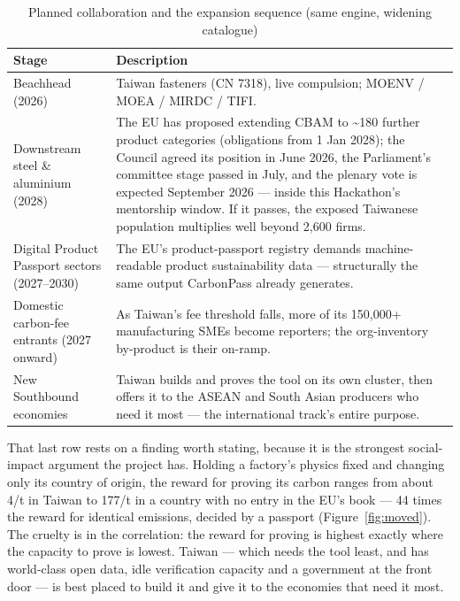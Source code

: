 \documentclass[11pt]{article}
\newcommand{\euro}{\texteuro}
\begin{document}
\begin{table}[h]
\caption{Planned collaboration and the expansion sequence (same engine, widening catalogue)}
\label{tab:expand}
\small
\begin{tabularx}{\textwidth}{l Y}
\toprule
\textbf{Stage} & \textbf{Description} \\
\midrule
Beachhead (2026) & Taiwan fasteners (CN 7318), live compulsion; MOENV / MOEA / MIRDC / TIFI. \\
Downstream steel \& aluminium (2028) & The EU has proposed extending CBAM to \textasciitilde180 further product categories (obligations from 1 Jan 2028); the Council agreed its position in June 2026, the Parliament's committee stage passed in July, and the plenary vote is expected September 2026 --- inside this Hackathon's mentorship window. If it passes, the exposed Taiwanese population multiplies well beyond 2{,}600 firms. \\
Digital Product Passport sectors (2027--2030) & The EU's product-passport registry demands machine-readable product sustainability data --- structurally the same output CarbonPass already generates. \\
Domestic carbon-fee entrants (2027 onward) & As Taiwan's fee threshold falls, more of its 150{,}000+ manufacturing SMEs become reporters; the org-inventory by-product is their on-ramp. \\
New Southbound economies & Taiwan builds and proves the tool on its own cluster, then offers it to the ASEAN and South Asian producers who need it most --- the international track's entire purpose. \\
\bottomrule
\end{tabularx}
\end{table}

That last row rests on a finding worth stating, because it is the strongest social-impact argument the project has. Holding a factory's physics fixed and changing only its country of origin, the reward for proving its carbon ranges from about \euro{}4/t in Taiwan to \euro{}177/t in a country with no entry in the EU's book --- 44 times the reward for identical emissions, decided by a passport (Figure~\ref{fig:moved}). The cruelty is in the correlation: the reward for proving is highest exactly where the capacity to prove is lowest. Taiwan --- which needs the tool least, and has world-class open data, idle verification capacity and a government at the front door --- is best placed to build it and give it to the economies that need it most.
\end{document}
